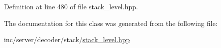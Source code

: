 Definition at line 480 of file stack\+\_\+level.\+hpp.



The documentation for this class was generated from the following file\+:\begin{DoxyCompactItemize}
\item 
inc/server/decoder/stack/\hyperlink{stack__level_8hpp}{stack\+\_\+level.\+hpp}\end{DoxyCompactItemize}
